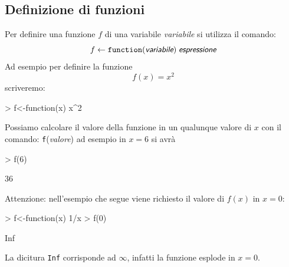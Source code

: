 \documentclass[onecolumn,11pt]{book}
\newcommand{\varia}[1]{\textsl{\textsf{#1}}}
\begin{document}
\subsection{Definizione di funzioni}
Per definire una funzione $f$ di una variabile \varia{variabile}  si utilizza il comando:
$$f\leftarrow \texttt{function}(\varia{variabile})\; \varia{espressione}$$
Ad esempio per definire la funzione $$f(x)=x^2$$ scriveremo:  
\begin{Schunk}
\begin{Sinput}
> f<-function(x) x^2
\end{Sinput}
\end{Schunk}
Possiamo calcolare il valore della funzione in un qualunque valore di $x$  con il comando:
\texttt{f}(\varia{valore})
ad esempio in $x=6$ si avr\`a 
\begin{Schunk}
\begin{Sinput}
> f(6)
\end{Sinput}
\begin{Soutput}
[1] 36
\end{Soutput}
\end{Schunk}
Attenzione: nell'esempio che segue viene richiesto il valore di $f(x)$ in $x=0$:
\begin{Schunk}
\begin{Sinput}
> f<-function(x)  1/x 
> f(0)
\end{Sinput}
\begin{Soutput}
[1] Inf
\end{Soutput}
\end{Schunk}
La dicitura \texttt{Inf} corrisponde ad $\infty$, infatti la funzione esplode in $x=0$.
\end{document}
